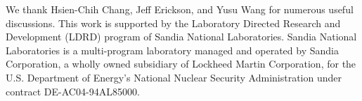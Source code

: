 \InNotSoCGVer{
\lowerBoundbyPathDecomp
}



We thank Hsien-Chih Chang, Jeff Erickson, and Yusu Wang for numerous useful discussions. This work is
supported by the Laboratory Directed Research and Development
(LDRD) program of Sandia National Laboratories. Sandia National
Laboratories is a multi-program laboratory managed and operated
by Sandia Corporation, a wholly owned subsidiary of Lockheed
Martin Corporation, for the U.S. Department of Energy's National
Nuclear Security Administration under contract DE-AC04-94AL85000.

\InNotSoCGVer{

%
}

\InSoCGVer{

}














